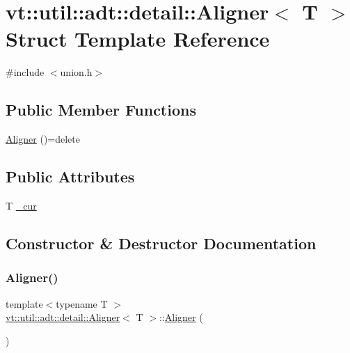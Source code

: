 \hypertarget{structvt_1_1util_1_1adt_1_1detail_1_1_aligner_3_01_t_01_4}{}\section{vt\+:\+:util\+:\+:adt\+:\+:detail\+:\+:Aligner$<$ T $>$ Struct Template Reference}
\label{structvt_1_1util_1_1adt_1_1detail_1_1_aligner_3_01_t_01_4}


{\ttfamily \#include $<$union.\+h$>$}

\subsection*{Public Member Functions}
\begin{DoxyCompactItemize}
\item 
\hyperlink{structvt_1_1util_1_1adt_1_1detail_1_1_aligner_3_01_t_01_4_a30f27c81da8f268242d9d89b3a0c436e}{Aligner} ()=delete
\end{DoxyCompactItemize}
\subsection*{Public Attributes}
\begin{DoxyCompactItemize}
\item 
T \hyperlink{structvt_1_1util_1_1adt_1_1detail_1_1_aligner_3_01_t_01_4_a7dd4c938c142ee94477bf484cdbde0c9}{\+\_\+cur}
\end{DoxyCompactItemize}


\subsection{Constructor \& Destructor Documentation}
\mbox{\label{structvt_1_1util_1_1adt_1_1detail_1_1_aligner_3_01_t_01_4_a30f27c81da8f268242d9d89b3a0c436e}} 
\subsubsection{\texorpdfstring{Aligner()}{Aligner()}}
{\footnotesize\ttfamily template$<$typename T $>$ \\
\hyperlink{structvt_1_1util_1_1adt_1_1detail_1_1_aligner}{vt\+::util\+::adt\+::detail\+::\+Aligner}$<$ T $>$\+::\hyperlink{structvt_1_1util_1_1adt_1_1detail_1_1_aligner}{Aligner} (\begin{DoxyParamCaption}{ }\end{DoxyParamCaption})\hspace{0.3cm}{\ttfamily [delete]}}



